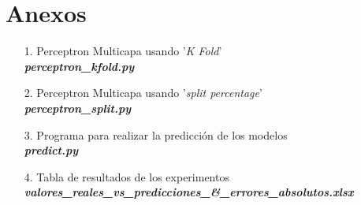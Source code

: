 \documentclass[12pt,a4paper, xcolor=table]{article}
\begin{document}
  \section{Anexos}
  \begin{itemize}
    \item [1.] Perceptron Multicapa usando '\textit{K Fold}'\\
    \textbf{\textit{perceptron\_kfold.py}}
    \item [2.] Perceptron Multicapa usando '\textit{split percentage}'\\
    \textbf{\textit{perceptron\_split.py}}
    \item [3.] Programa para realizar la predicción de los modelos\\
    \textbf{\textit{predict.py}}
    \item [4.] Tabla de resultados de los experimentos\\
    \textbf{\textit{valores\_reales\_vs\_predicciones\_\&\_errores\_absolutos.xlsx}}
  \end{itemize}
\end{document}
